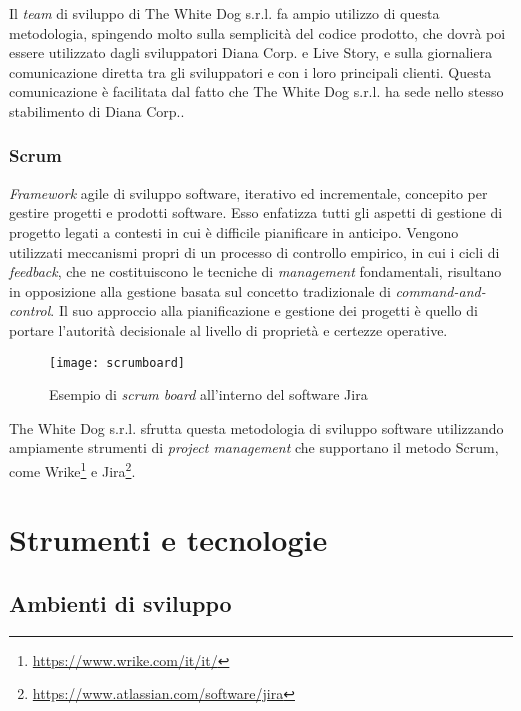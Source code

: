 Il \textit{team} di sviluppo di The White Dog s.r.l. fa ampio utilizzo di questa metodologia, spingendo molto sulla semplicità del codice prodotto, che dovrà poi essere utilizzato dagli sviluppatori Diana Corp. e Live Story, e sulla giornaliera comunicazione diretta tra gli sviluppatori e con i loro principali clienti. Questa comunicazione è facilitata dal fatto che The White Dog s.r.l. ha sede nello stesso stabilimento di Diana Corp..

\subsubsection{Scrum}

\textit{Framework} agile di sviluppo software, iterativo ed incrementale, concepito per gestire progetti e prodotti software. Esso enfatizza tutti gli aspetti di gestione di progetto legati a contesti in cui è difficile pianificare in anticipo. Vengono utilizzati meccanismi propri di un processo di controllo empirico, in cui i cicli di \textit{feedback}, che ne costituiscono le tecniche di \textit{management} fondamentali, risultano in opposizione alla gestione basata sul concetto tradizionale di \textit{command-and-control}. Il suo approccio alla pianificazione e gestione dei progetti è quello di portare l'autorità decisionale al livello di proprietà e certezze operative.

\label{Scrum board}
\begin{figure}[ht]
	\begin{center}
		\texttt{[image: scrumboard]}
		\caption{Esempio di \textit{scrum board} all'interno del software Jira}
	\end{center}
\end{figure}
\FloatBarrier

The White Dog s.r.l. sfrutta questa metodologia di sviluppo software utilizzando ampiamente strumenti di \textit{project management} che supportano il metodo Scrum, come Wrike\footnote[4]{\url{https://www.wrike.com/it/it/}} e Jira\footnote[5]{\url{https://www.atlassian.com/software/jira}}.

\section{Strumenti e tecnologie}

\subsection{Ambienti di sviluppo}

